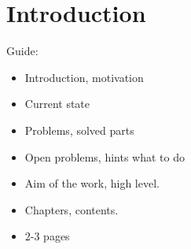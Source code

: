\documentclass[
  digital, %
  twoside, %
  table,   %
  lof,     %
  lot,     %
]{fithesis3}
\theoremstyle{definition}
\theoremstyle{remark}
\begin{document}
\setlength{\marginparwidth}{2.5cm}  %


\chapter{Introduction}
\begin{shaded}
Guide:
\begin{itemize}
    \item Introduction, motivation
    \item Current state
    \item Problems, solved parts
    \item Open problems, hints what to do
    \item Aim of the work, high level.
    \item Chapters, contents.
    \item 2-3 pages %
\end{itemize}
\end{shaded}
\end{document}

